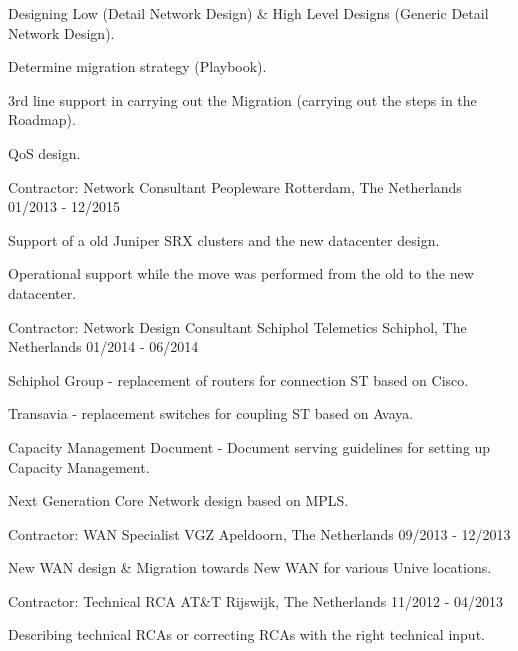 \begin{cventries}
{\begin{cvitems}
        \item {Designing Low (Detail Network Design) \& High Level Designs (Generic Detail Network Design).}
        \item {Determine migration strategy (Playbook).}
	\item {3rd line support in carrying out the Migration (carrying out the steps in the Roadmap).}
	\item {QoS design.}
      \end{cvitems}
    }
  \cventry
    {Contractor: Network Consultant} %
    {Peopleware} %
    {Rotterdam, The Netherlands} %
    {01/2013 - 12/2015} %
    {
      \begin{cvitems} %
      \item {Support of a old Juniper SRX clusters and the new datacenter design.}
      \item {Operational support while the move was performed from the old to the new datacenter.}
      \end{cvitems}
    }
 \cventry
    {Contractor: Network Design Consultant} %
    {Schiphol Telemetics} %
    {Schiphol, The Netherlands} %
    {01/2014 - 06/2014} %
    {
      \begin{cvitems} %
      \item {Schiphol Group - replacement of routers for connection ST based on Cisco.}
      \item {Transavia - replacement switches for coupling ST based on Avaya.}
      \item {Capacity Management Document - Document serving guidelines for setting up Capacity Management.}
      \item {Next Generation Core Network design based on MPLS.}
      \end{cvitems}
    }
 \cventry
    {Contractor: WAN Specialist} %
    {VGZ} %
    {Apeldoorn, The Netherlands} %
    {09/2013 - 12/2013} %
    {
      \begin{cvitems} %
      \item {New WAN design \& Migration towards New WAN for various Unive locations.}
      \end{cvitems}
    }
 \cventry
    {Contractor: Technical RCA} %
    {AT\&T} %
    {Rijswijk, The Netherlands} %
    {11/2012 - 04/2013} %
    {
      \begin{cvitems} %
      \item {Describing technical RCAs or correcting RCAs with the right technical input.}
      \end{cvitems}
    }
\end{cventries}
